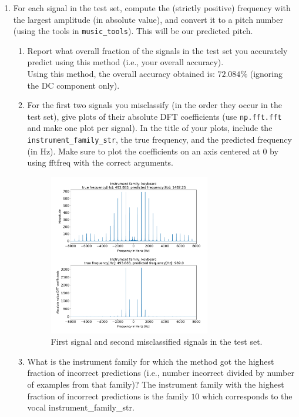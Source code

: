 \documentclass[12pt,twoside]{article}
\begin{document}
\begin{enumerate}
\begin{enumerate}
    
  \item For each signal in the test set, compute the (strictly positive)
    frequency with the largest amplitude (in absolute value), and
    convert it to a pitch number (using the tools in
    \texttt{music\_tools}).  This will be our predicted pitch.
    \begin{enumerate}
    \item Report what overall fraction of the signals in
      the test set you accurately predict using this method (i.e.,
      your overall accuracy).\\
      Using this method, the overall accuracy obtained is: $72.084\%$ (ignoring the DC component only).
    \item For the
      first two signals you misclassify (in the order they occur in the
      test set), give plots of their absolute
      DFT coefficients (use \texttt{np.fft.fft} and make one plot per
      signal). In the title of your plots, include the
      \texttt{instrument\_family\_str}, the true frequency, and the
      predicted frequency (in Hz).  Make
      sure to plot the coefficients on an axis centered at $0$ by using
      fftfreq with the correct arguments.\\
      
	\begin{figure}[H]
		\centering
		\captionsetup{justification=centering}
		\includegraphics[width=200pt]{code/musicdata/misclassified_signals.pdf}
		\caption{First signal and second misclassified signals in the test set.}
	\end{figure}

      
    \item What is the instrument family for which the method got the
      highest fraction of incorrect predictions (i.e., number incorrect
      divided by number of examples from that family)?
      The instrument family with the highest fraction of incorrect predictions is the family $10$ which corresponds
      to the vocal instrument\_family\_str.
      

\end{enumerate}
\end{enumerate}
\end{enumerate}
\end{document}
